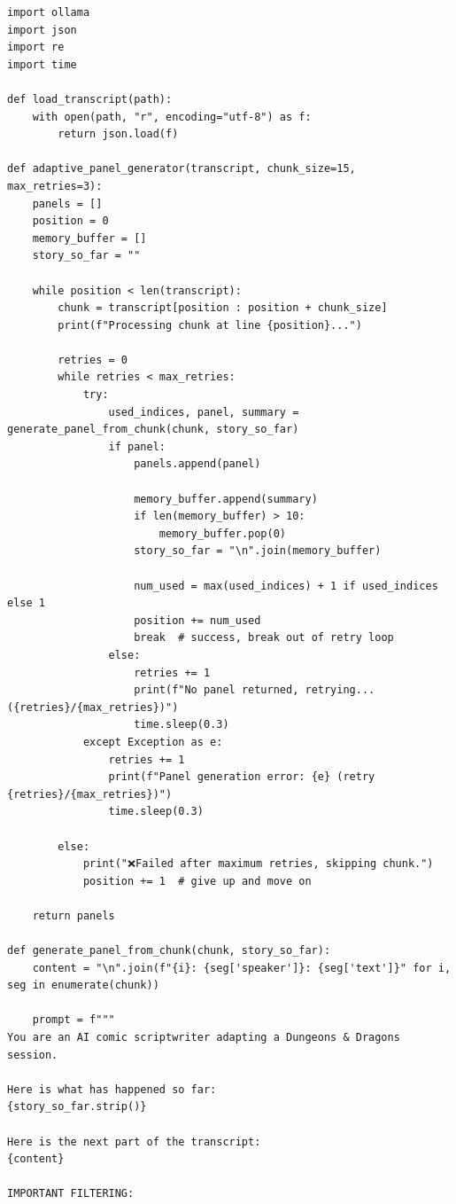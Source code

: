 \begin{lstlisting}[style=pythonstyle, caption={TextToScript.py}, label={lst:TextToScript.py}]
import ollama
import json
import re
import time

def load_transcript(path):
    with open(path, "r", encoding="utf-8") as f:
        return json.load(f)

def adaptive_panel_generator(transcript, chunk_size=15, max_retries=3):
    panels = []
    position = 0
    memory_buffer = []
    story_so_far = ""

    while position < len(transcript):
        chunk = transcript[position : position + chunk_size]
        print(f"Processing chunk at line {position}...")

        retries = 0
        while retries < max_retries:
            try:
                used_indices, panel, summary = generate_panel_from_chunk(chunk, story_so_far)
                if panel:
                    panels.append(panel)

                    memory_buffer.append(summary)
                    if len(memory_buffer) > 10:
                        memory_buffer.pop(0)
                    story_so_far = "\n".join(memory_buffer)

                    num_used = max(used_indices) + 1 if used_indices else 1
                    position += num_used
                    break  # success, break out of retry loop
                else:
                    retries += 1
                    print(f"No panel returned, retrying... ({retries}/{max_retries})")
                    time.sleep(0.3)
            except Exception as e:
                retries += 1
                print(f"Panel generation error: {e} (retry {retries}/{max_retries})")
                time.sleep(0.3)

        else:
            print("❌Failed after maximum retries, skipping chunk.")
            position += 1  # give up and move on

    return panels

def generate_panel_from_chunk(chunk, story_so_far):
    content = "\n".join(f"{i}: {seg['speaker']}: {seg['text']}" for i, seg in enumerate(chunk))

    prompt = f"""
You are an AI comic scriptwriter adapting a Dungeons & Dragons session.

Here is what has happened so far:
{story_so_far.strip()}

Here is the next part of the transcript:
{content}

IMPORTANT FILTERING:


\end{lstlisting}
